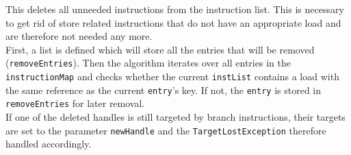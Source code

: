 This deletes all unneeded instructions from the instruction list. This is necessary to get rid of store related instructions that do not have an appropriate load and are therefore not needed any more. \\
First, a list is defined which will store all the entries that will be removed (\texttt{removeEntries}). Then the algorithm iterates over all entries in the \texttt{instructionMap} and checks whether the current \texttt{instList} contains a load with the same reference as the current \texttt{entry}’s key. If not, the \texttt{entry} is stored in \texttt{removeEntries} for later removal.\\
If one of the deleted handles is still targeted by branch instructions, their targets are set to the parameter \texttt{newHandle} and the \texttt{TargetLostException} therefore handled accordingly.